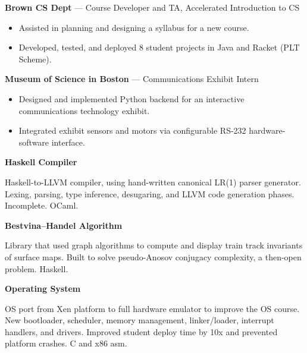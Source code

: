 \documentclass[10pt,letterpaper]{article}
\newcommand{\marginlabel}[1]{\smallskip\noindent{\large{\textsf{\textbf{#1}}}}\smallskip}
\newcommand{\dates}[1]{\item[#1\hfill]}
\newcommand{\jobhead}[3]{{\dates{#1}{\bf #3} --- {#2}}}
\newcommand{\projecthead}[2]{{\dates{#1}{\bf #2}}}
\newenvironment{jobs}
  {\leftmargini=24.1mm%
   \begin{list}%
    {}
    {\setlength\labelwidth{22mm}\itemsep=1.5mm}}
  {\end{list}}
\begin{document}
\begin{jobs}
{\jobhead{2009}{Course Developer and TA, Accelerated Introduction to CS}
{Brown CS Dept}
\begin{itemize}
\item Assisted in planning and designing a syllabus for a new course.
\item Developed, tested, and deployed 8 student projects in Java and Racket
(PLT Scheme).
\end{itemize}

\jobhead{2008\,--\,2009}{Communications Exhibit Intern}{Museum of Science in
Boston}
\begin{itemize}
\item Designed and implemented Python backend for an interactive
communications technology exhibit.
\item Integrated exhibit sensors and motors via configurable RS-232
hardware-software interface.
\end{itemize}
} %

\end{jobs}

\marginlabel{Projects}

\begin{jobs}

\projecthead{2013\,--2014}{Haskell Compiler}

\noindent Haskell-to-LLVM compiler, using hand-written canonical LR(1) parser
generator. Lexing, parsing, type inference, desugaring,
and LLVM code generation phases. Incomplete. OCaml.

\projecthead{2013}{Bestvina--Handel Algorithm}

\noindent Library that used graph algorithms to
compute and display train track invariants of surface maps.
Built to solve pseudo-Anosov conjugacy complexity, a then-open
problem. Haskell.

\projecthead{2010\,--\,2011}{Operating System}

\noindent OS port from Xen platform to full hardware emulator to improve the OS
course.  New bootloader, scheduler, memory management, linker/loader, interrupt
handlers, and drivers. Improved student deploy time by 10x and prevented
platform crashes. C and x86 asm.

\end{jobs}
\end{document}
